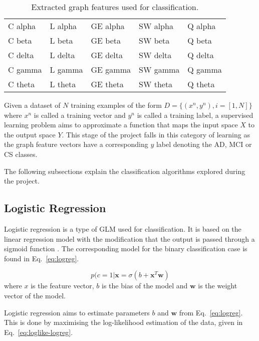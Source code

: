 		\begin{table}
			\centering
			\begin{tabular}{lllll}
			C alpha  & L alpha & GE alpha & SW alpha & Q alpha  \\
			C beta   & L beta & GE beta & SW beta & Q beta  \\
			C delta  & L delta & GE delta & SW delta & Q delta \\
			C gamma  & L gamma & GE gamma & SW gamma & Q gamma \\
			C theta  & L theta & GE theta & SW theta & Q theta  \\
			\end{tabular}
			\caption{Extracted graph features used for classification.}
			\label{table:features}
		\end{table}

		Given a dataset of \(N\) training examples of the form \(D = \{(x^n, y^n), i = [1,N]\}\) where \(x^n\) is called a training vector and \(y^n\) is called a training label, a supervised learning problem aims to approximate a function that maps the input space \(X\) to the output space \(Y\). This stage of the project falls in this category of learning as the graph feature vectors have a corresponding \(y\) label denoting the \ac{AD}, \ac{MCI} or \ac{CS} classes.

		The following subsections explain the classification algorithms explored during the project. 

		\subsection{Logistic Regression}
		Logistic regression is a type of \ac{GLM} used for classification. It is based on the linear regression model with the modification that the output is passed through a sigmoid function \autocite[21]{Murphy:2012:MLP:2380985}. The corresponding model for the binary classification case is found in Eq.~\ref{eq:logreg}.

		\begin{equation}\label{eq:logreg}
			p(c=1|\boldsymbol{x} = \sigma(b+\boldsymbol{x}^T \boldsymbol{w})
		\end{equation}
		where \(x\) is the feature vector, \(b\) is the bias of the model and \(\boldsymbol{w}\) is the weight vector of the model. 

		Logistic regression aims to estimate parameters \(b\) and \(\boldsymbol{w}\) from Eq.~\ref{eq:logreg}. This is done by maximising the log-likelihood estimation of the data, given in Eq.~\ref{eq:loglike-logreg}.

